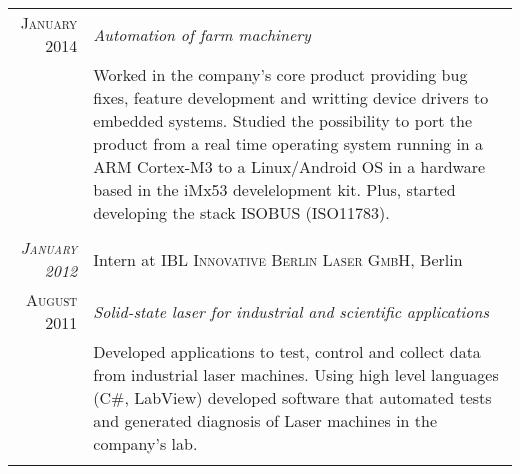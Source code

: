 \documentclass[a4paper,10pt]{article}
\begin{document}
\begin{tabular}{r|p{11cm}}
        \textsc{January 2014}        &\emph
                                     {Automation of farm machinery} \\
                                     &\footnotesize
                                     {
                                         Worked in the company's core product
                                         providing bug fixes, feature
                                         development and writting device drivers
                                         to embedded systems. Studied the
                                         possibility to port the product from a
                                         real time operating system running in
                                         a ARM Cortex-M3 to a Linux/Android OS
                                         in a hardware based in the iMx53
                                         develelopment kit. Plus, started
                                         developing the stack ISOBUS (ISO11783).
                                     } \\
                                     \multicolumn{2}{c}{} \\

        \emph{\textsc{January 2012}} & Intern at \textsc
                                     {IBL Innovative Berlin Laser GmbH},
                                     Berlin \\

        \textsc{August 2011}         &\emph
                                     {Solid-state laser for industrial
                                        and scientific applications} \\
                                     &\footnotesize
                                     {
                                         Developed applications to test, control
                                         and collect data from industrial laser
                                         machines. Using high level languages
                                         (C\#, LabView) developed software that
                                         automated tests and generated diagnosis
                                         of Laser machines in the company's lab.
                                     } \\
                                     \multicolumn{2}{c}{} \\
    \end{tabular}

\end{document}
